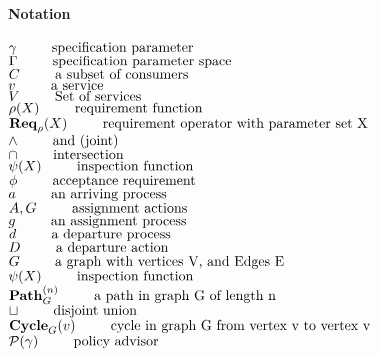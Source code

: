 \documentclass{article}
\newenvironment{notation}
{
    \newpage
    
    \paragraph{\Huge Notation}
    \begin{flushleft}
}
{
    \end{flushleft}
}
\newcommand{\notate}[2]{$#1 \hspace{0.35in} \mbox{#2}$}
\theoremstyle{definition}
\theoremstyle{remark}
\newcommand{\reqop}[2]{\mathbf{Req}_{#1}(#2)}
\newcommand{\path}[2]{\mathbf{Path}^{#2}_{#1}}
\newcommand{\cyclepath}[1]{\mathbf{Cycle}_{#1}}
\begin{document}
	\newpage    

	\begin{notation}
		\notate{\gamma}{specification parameter}\\
		\notate{\Gamma}{specification parameter space}\\
		\notate{C}{a subset of consumers}\\
		\notate{v}{a service}\\
		\notate{V}{Set of services}\\
		\notate{\rho(X)}{requirement function}\\
		\notate{\reqop{\rho}{X}}{requirement operator with parameter set X}\\
        \notate{\wedge}{and (joint)}\\
        \notate{\cap}{intersection}\\
        \notate{\psi(X)}{inspection function}\\
        \notate{\phi}{acceptance requirement}\\
		\notate{a}{an arriving process}\\
		\notate{A,G}{assignment actions}\\
		\notate{g}{an assignment process}\\
		\notate{d}{a departure process}\\
		\notate{D}{a departure action}\\
        \notate{G}{a graph with vertices V, and Edges E}\\
        \notate{\psi(X)}{inspection function}\\
        \notate{\path{G}{(n)}}{a path in graph G of length n}\\
        \notate{\sqcup}{disjoint union}\\
        \notate{\cyclepath{G}(v)}{cycle in graph G from vertex v to vertex v}\\
        \notate{\mathcal{P}(\gamma)}{policy advisor}
     \end{notation}

	\newpage
	
\end{document}

